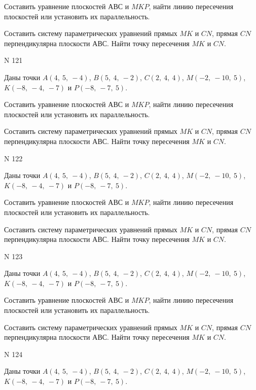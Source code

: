 \documentclass[11pt]{report}
\begin{document}
Составить уравнение плоскостей $АВС$ и $MKP$,
найти линию пересечения плоскостей или установить их параллельность.

Составить систему параметрических уравнений прямых $MK$ и $CN$,
прямая $CN$ перпендикулярна плоскости $АВС$. 
Найти точку пересечения $MK$ и $CN$.



 N 121

Даны точки $A\left( 4, \  5, \  -4\right)$, $B\left( 5, \  4, \  -2\right)$, $C\left( 2, \  4, \  4\right)$, $M\left( -2, \  -10, \  5\right)$, $K\left( -8, \  -4, \  -7\right)$ и $P\left( -8, \  -7, \  5\right)$.


Составить уравнение плоскостей $АВС$ и $MKP$,
найти линию пересечения плоскостей или установить их параллельность.

Составить систему параметрических уравнений прямых $MK$ и $CN$,
прямая $CN$ перпендикулярна плоскости $АВС$. 
Найти точку пересечения $MK$ и $CN$.



 N 122

Даны точки $A\left( 4, \  5, \  -4\right)$, $B\left( 5, \  4, \  -2\right)$, $C\left( 2, \  4, \  4\right)$, $M\left( -2, \  -10, \  5\right)$, $K\left( -8, \  -4, \  -7\right)$ и $P\left( -8, \  -7, \  5\right)$.


Составить уравнение плоскостей $АВС$ и $MKP$,
найти линию пересечения плоскостей или установить их параллельность.

Составить систему параметрических уравнений прямых $MK$ и $CN$,
прямая $CN$ перпендикулярна плоскости $АВС$. 
Найти точку пересечения $MK$ и $CN$.



 N 123

Даны точки $A\left( 4, \  5, \  -4\right)$, $B\left( 5, \  4, \  -2\right)$, $C\left( 2, \  4, \  4\right)$, $M\left( -2, \  -10, \  5\right)$, $K\left( -8, \  -4, \  -7\right)$ и $P\left( -8, \  -7, \  5\right)$.


Составить уравнение плоскостей $АВС$ и $MKP$,
найти линию пересечения плоскостей или установить их параллельность.

Составить систему параметрических уравнений прямых $MK$ и $CN$,
прямая $CN$ перпендикулярна плоскости $АВС$. 
Найти точку пересечения $MK$ и $CN$.



 N 124

Даны точки $A\left( 4, \  5, \  -4\right)$, $B\left( 5, \  4, \  -2\right)$, $C\left( 2, \  4, \  4\right)$, $M\left( -2, \  -10, \  5\right)$, $K\left( -8, \  -4, \  -7\right)$ и $P\left( -8, \  -7, \  5\right)$.
\end{document}
